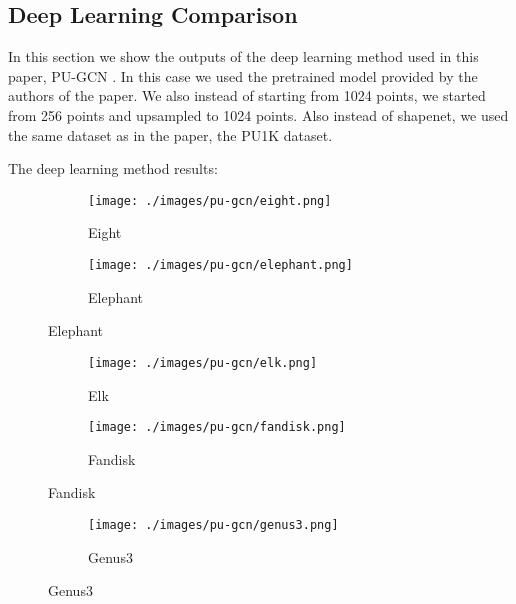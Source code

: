 \subsection{Deep Learning Comparison}

In this section we show the outputs of the deep learning method used in this paper, PU-GCN \cite{PU-GCN}. 
In this case we used the pretrained model provided by the authors of the paper.
We also instead of starting from 1024 points, we started from 256 points and upsampled to 1024 points.
Also instead of shapenet, we used the same dataset as in the paper, the PU1K dataset.

The deep learning method results:

\begin{figure}[H]
	\centering 
	\begin{subfigure}{0.45\textwidth}
		\texttt{[image: ./images/pu-gcn/eight.png]}
		\caption{Eight}
	\end{subfigure}
	\begin{subfigure}{0.45\textwidth}
		\texttt{[image: ./images/pu-gcn/elephant.png]}
		\caption{Elephant}
	\end{subfigure}
\end{figure}
\begin{figure}[H]
	\begin{subfigure}{0.45\textwidth}
		\texttt{[image: ./images/pu-gcn/elk.png]}
		\caption{Elk}
	\end{subfigure}
	\begin{subfigure}{0.45\textwidth}
		\texttt{[image: ./images/pu-gcn/fandisk.png]}
		\caption{Fandisk}
	\end{subfigure}
\end{figure}
\begin{figure}[H]
	\begin{subfigure}{0.45\textwidth}
		\texttt{[image: ./images/pu-gcn/genus3.png]}
		\caption{Genus3}
	\end{subfigure}
\end{figure}

